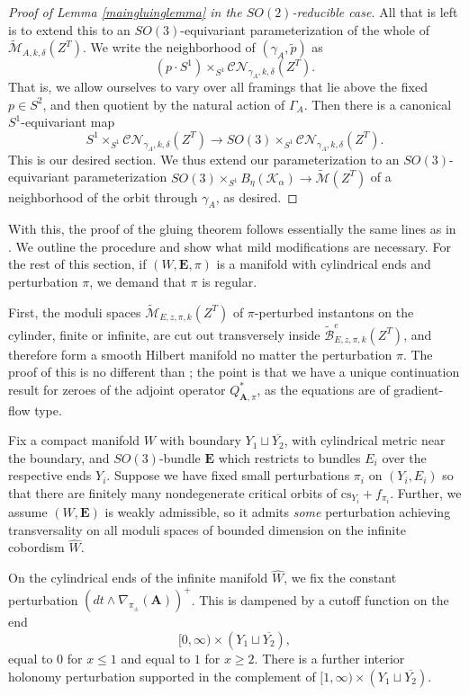 \documentclass{memo-l}
\theoremstyle{definition}
\theoremstyle{remark}
\numberwithin{section}{chapter}
\numberwithin{equation}{chapter}
\begin{document}
\begin{proof}[Proof of Lemma \ref{maingluinglemma} in the $SO(2)$-reducible case]
All that is left is to extend this to an $SO(3)$-equivariant parameterization of the whole of $\widetilde{\mathcal M}_{A,k,\delta}(Z^T)$. We write the neighborhood of $(\gamma_A, \tilde p)$ as 
$$(p \cdot S^1) \times_{S^1} \mathcal{CN}_{\gamma_A, k, \delta}(Z^T).$$
That is, we allow ourselves to vary over all framings that lie above the fixed $p \in S^2$, and then quotient by the natural action of $\Gamma_A$. Then there is a canonical $S^1$-equivariant map 
$$S^1 \times_{S^1} \mathcal{CN}_{\gamma_A, k, \delta}(Z^T) \to SO(3) \times_{S^1} \mathcal{CN}_{\gamma_A, k, \delta}(Z^T).$$ 
This is our desired section. We thus extend our parameterization to an $SO(3)$-equivariant parameterization $SO(3) \times_{S^1} B_\eta(\mathcal K_\alpha) \to \widetilde{\mathcal M}(Z^T)$ of a neighborhood of the orbit through $\gamma_A$, as desired.
\end{proof}

With this, the proof of the gluing theorem follows essentially the same lines as in \cite[Chapters~19~and~24.7]{KMSW}. We outline the procedure and show what mild modifications are necessary. For the rest of this section, if $(W,\mathbf{E},\pi)$ is a manifold with cylindrical ends and perturbation $\pi$, we demand that $\pi$ is regular.

First, the moduli spaces $\widetilde{\mathcal M}_{E,z,\pi,k}(Z^T)$ of $\pi$-perturbed instantons on the cylinder, finite or infinite, are cut out transversely inside $\widetilde{\mathcal B}^e_{E,z,\pi,k}(Z^T)$, and therefore form a smooth Hilbert manifold no matter the perturbation $\pi$. The proof of this is no different than \cite[Theorem~17.3.1]{KMSW}; the point is that we have a unique continuation result for zeroes of the adjoint operator $Q^*_{\mathbf{A}, \pi}$, as the equations are of gradient-flow type.

Fix a compact manifold $W$ with boundary $Y_1 \sqcup \overline{Y_2}$, with cylindrical metric near the boundary, and $SO(3)$-bundle $\mathbf{E}$ which restricts to bundles $E_i$ over the respective ends $Y_i$. Suppose we have fixed small perturbations $\pi_i$ on $(Y_i, E_i)$ so that there are finitely many nondegenerate critical orbits of $\text{cs}_{Y_i}+f_{\pi_i}$. Further, we assume $(W,\mathbf{E})$ is weakly admissible, so it admits \emph{some} perturbation achieving transversality on all moduli spaces of bounded dimension on the infinite cobordism $\hat W$.

On the cylindrical ends of the infinite manifold $\hat W$, we fix the constant perturbation $(dt \wedge \nabla_{\pi_\pm}(\mathbf{A}))^+$. This is dampened by a cutoff function on the end 
$$[0, \infty) \times (Y_1 \sqcup \overline{Y_2}),$$ equal to $0$ for $x \leq 1$ and equal to $1$ for $x \geq 2$. There is a further interior holonomy perturbation supported in the complement of $[1, \infty) \times (Y_1 \sqcup \overline{Y_2})$. 
\end{document}
